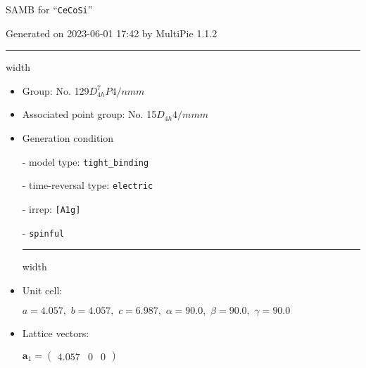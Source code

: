 \documentclass[fleqn,10pt,landscape]{article}
\begin{document}
\setcounter{MaxMatrixCols}{16}

\setlength{\baselineskip}{16pt}
\footnotesize
\begin{center}
\LARGE
SAMB for ``\texttt{CeCoSi}''
\end{center}
\begin{flushright}
Generated on 2023-06-01 17:42 by MultiPie 1.1.2
\end{flushright}
\vspace{1cm}


 \hfil \hrule height 1mm width \textwidth \hfil

\begin{itemize}
\item Group: No. 129\quad$D_{4h}^{7}$\quad$P4/nmm$\quad[ tetragonal ]

\item Associated point group: No. 15\quad$D_{4h}$\quad$4/mmm$\quad[ tetragonal ]

\vspace{5mm}

\item Generation condition

\quad - model type: \texttt{tight_binding}

\quad - time-reversal type: \texttt{electric}

\quad - irrep: \texttt{[A1g]}

\quad - \texttt{spinful}


 \hfil \hrule height 1mm width \textwidth \hfil

\item Unit cell:

\quad $a=4.057,\,\, b=4.057,\,\, c=6.987,\,\, \alpha=90.0,\,\, \beta=90.0,\,\, \gamma=90.0$

\item Lattice vectors:

\quad $\bm{a}_1=\begin{pmatrix} 4.057 & 0 & 0 \end{pmatrix}$


\end{itemize}
\end{document}
